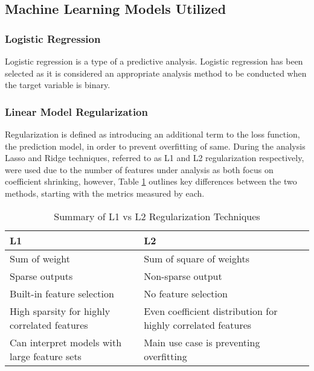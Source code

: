 \subsection{Machine Learning Models Utilized}

\subsubsection{Logistic Regression}
Logistic regression is a type of a predictive analysis. Logistic regression has been selected as it is considered an appropriate analysis method to be conducted when the target variable is binary. 

\subsubsection{Linear Model Regularization} 
Regularization is defined as introducing an additional term to the loss function, the prediction model, in order to prevent overfitting of same. During the analysis Lasso and Ridge techniques, referred to as L1 and L2 regularization respectively, were used due to the number of features under analysis as both focus on coefficient shrinking, however, Table \ref{tab:regularization_l1_vs_l2} outlines key differences between the two methods, starting with the metrics measured by each.

\begin{table}[h!]
\centering
\begin{tabular}{@{}ll@{}}
\toprule
L1                                                 & L2                                                           \\ \midrule
Sum of weight                                      & Sum of square of weights                                     \\
Sparse outputs                                     & Non-sparse output                                            \\
Built-in feature selection                         & No feature selection                                         \\
High sparsity for highly correlated features       & Even coefficient distribution for highly correlated features \\
Can  interpret models with large feature sets & Main use case is preventing overfitting                      \\ \bottomrule
\end{tabular}
\caption{Summary of L1 vs L2 Regularization Techniques}
\label{tab:regularization_l1_vs_l2}
\end{table}


